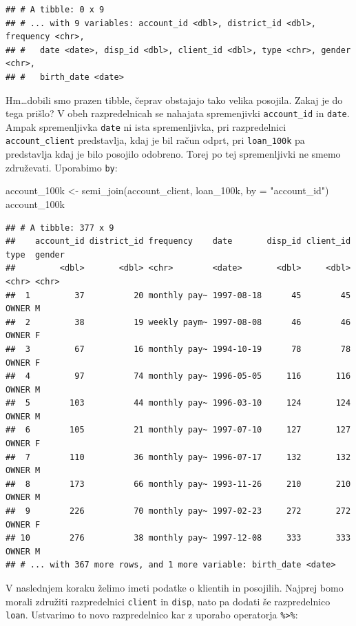 \documentclass[
]{book}
\newenvironment{Shaded}{\begin{snugshade}}{\end{snugshade}}
\newcommand{\AttributeTok}[1]{\textcolor[rgb]{0.77,0.63,0.00}{#1}}
\newcommand{\FunctionTok}[1]{\textcolor[rgb]{0.00,0.00,0.00}{#1}}
\newcommand{\NormalTok}[1]{#1}
\newcommand{\OtherTok}[1]{\textcolor[rgb]{0.56,0.35,0.01}{#1}}
\newcommand{\StringTok}[1]{\textcolor[rgb]{0.31,0.60,0.02}{#1}}
\begin{document}
\begin{verbatim}
## # A tibble: 0 x 9
## # ... with 9 variables: account_id <dbl>, district_id <dbl>, frequency <chr>,
## #   date <date>, disp_id <dbl>, client_id <dbl>, type <chr>, gender <chr>,
## #   birth_date <date>
\end{verbatim}

Hm\ldots dobili smo prazen tibble, čeprav obstajajo tako velika posojila. Zakaj je do tega prišlo? V obeh razpredelnicah se nahajata spremenjivki \texttt{account\_id} in \texttt{date}. Ampak spremenljivka \texttt{date} ni ista spremenljivka, pri razpredelnici \texttt{account\_client} predstavlja, kdaj je bil račun odprt, pri \texttt{loan\_100k} pa predstavlja kdaj je bilo posojilo odobreno. Torej po tej spremenljivki ne smemo združevati. Uporabimo \texttt{by}:

\begin{Shaded}
\begin{Highlighting}[]
\NormalTok{account\_100k }\OtherTok{\textless{}{-}} \FunctionTok{semi\_join}\NormalTok{(account\_client, loan\_100k, }\AttributeTok{by =} \StringTok{"account\_id"}\NormalTok{)}
\NormalTok{account\_100k}
\end{Highlighting}
\end{Shaded}

\begin{verbatim}
## # A tibble: 377 x 9
##    account_id district_id frequency    date       disp_id client_id type  gender
##         <dbl>       <dbl> <chr>        <date>       <dbl>     <dbl> <chr> <chr> 
##  1         37          20 monthly pay~ 1997-08-18      45        45 OWNER M     
##  2         38          19 weekly paym~ 1997-08-08      46        46 OWNER F     
##  3         67          16 monthly pay~ 1994-10-19      78        78 OWNER F     
##  4         97          74 monthly pay~ 1996-05-05     116       116 OWNER M     
##  5        103          44 monthly pay~ 1996-03-10     124       124 OWNER M     
##  6        105          21 monthly pay~ 1997-07-10     127       127 OWNER F     
##  7        110          36 monthly pay~ 1996-07-17     132       132 OWNER M     
##  8        173          66 monthly pay~ 1993-11-26     210       210 OWNER M     
##  9        226          70 monthly pay~ 1997-02-23     272       272 OWNER F     
## 10        276          38 monthly pay~ 1997-12-08     333       333 OWNER M     
## # ... with 367 more rows, and 1 more variable: birth_date <date>
\end{verbatim}

V naslednjem koraku želimo imeti podatke o klientih in posojilih. Najprej bomo morali združiti razpredelnici \texttt{client} in \texttt{disp}, nato pa dodati še razpredelnico \texttt{loan}. Ustvarimo to novo razpredelnico kar z uporabo operatorja \texttt{\%\textgreater{}\%}:
\end{document}
